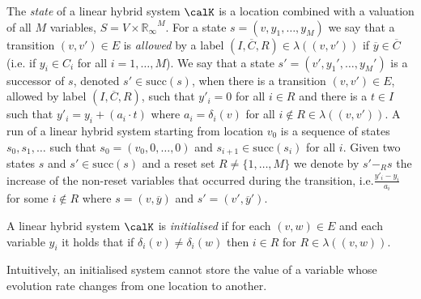\documentclass[fleqn,envcountsame]{LMCS}
\newcommand{\ie}{i.e.\xspace}
\newcommand{\Rinf}{\ensuremath{\mathbb{R}_{\infty}}}
\newcommand{\ol}[1]{\ensuremath{\overline{#1}}}
\newcommand{\labels}{\ensuremath{\lambda}}
\newcommand{\successor}{\ensuremath{\mathrm{succ}}}
\newcommand{\coeff}{\ensuremath{\delta}} \newcommand{\indexi}{\ensuremath{\iota}}
\begin{document}
The \emph{state} of a linear hybrid system $\calK$ is a location
combined with a valuation of all $M$ variables, $S = V \times \Rinf^M$.
For a state $s = (v, y_1, \ldots, y_M)$ we say that a transition
$(v, v') \in E$ is \emph{allowed} by a label $(I, \ol{C}, R) \in \labels((v, v'))$
if $\ol{y} \in \ol{C}$ (\ie if $y_i \in C_i$ for all $i = 1, \ldots, M$).
We say that a state $s' = (v', y_1', \ldots, y_M')$ is a successor of $s$,
denoted $s' \in \successor(s)$, when there is a transition $(v,v') \in E$,
allowed by label $(I, \ol{C}, R)$, such that $y'_i = 0$ for all $i \in R$ and
there is a $t \in I$ such that $y'_i = y_i + (a_i \cdot t)$ where 
$a_i=\coeff_i(v)$ for all $i \not \in R \in \labels((v,v'))$.
A run of a linear hybrid system starting from location $v_0$ is
a sequence of states $s_0, s_1, \ldots$ such that $s_0 = (v_0, 0, \ldots, 0)$
and $s_{i+1} \in \successor(s_i)$ for all $i$. Given two states $s$ and
$s' \in \successor(s)$ and a reset set $R \neq \{1,\ldots,M\}$ we denote by
$s' -_R s$ the increase of the non-reset variables that occurred during the
transition, \ie $\frac {y'_i - y_i} {a_i}$ for some $i \not\in R$ where
$s=(v,\ol{y})$ and $s'=(v',\ol{y}')$. 

\begin{defi}
A linear hybrid system $\calK$ is \emph{initialised} if for each
$(v,w) \in E$ and each variable $y_i$ it holds that if 
$\coeff_i(v) \neq \coeff_i(w)$ then $i \in R$ for $R \in\lambda((v,w))$.
\end{defi}

Intuitively, an initialised system cannot store the value of a variable
whose evolution rate changes from one location to another.
\end{document}
